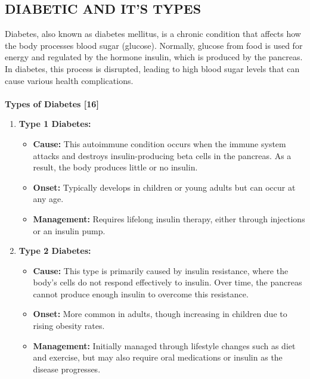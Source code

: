 \documentclass[12pt,a4paper]{article}
\begin{document}
\subsection{DIABETIC AND IT’S TYPES}
Diabetes, also known as diabetes mellitus, is a chronic condition that affects how the body processes blood sugar (glucose). Normally, glucose from food is used for energy and regulated by the hormone insulin, which is produced by the pancreas. In diabetes, this process is disrupted, leading to high blood sugar levels that can cause various health complications. \\
\\
\textbf{Types of Diabetes [16]}
\begin{enumerate}
    \item \textbf{Type 1 Diabetes:}
    \begin{itemize}
        \item \textbf{Cause:} This autoimmune condition occurs when the immune system attacks and destroys insulin-producing beta cells in the pancreas. As a result, the body produces little or no insulin.

        \item \textbf{Onset:} Typically develops in children or young adults but can occur at any age.

        \item \textbf{Management:} Requires lifelong insulin therapy, either through injections or an insulin pump.
        
    \end{itemize}

    \item \textbf{Type 2 Diabetes:}
    \begin{itemize}
        \item \textbf{Cause:} This type is primarily caused by insulin resistance, where the body's cells do not respond effectively to insulin. Over time, the pancreas cannot produce enough insulin to overcome this resistance.

        \item \textbf{Onset:} More common in adults, though increasing in children due to rising obesity rates.

        \item \textbf{Management:} Initially managed through lifestyle changes such as diet and exercise, but may also require oral medications or insulin as the disease progresses.
        
    \end{itemize}
    

\end{enumerate}
\end{document}
